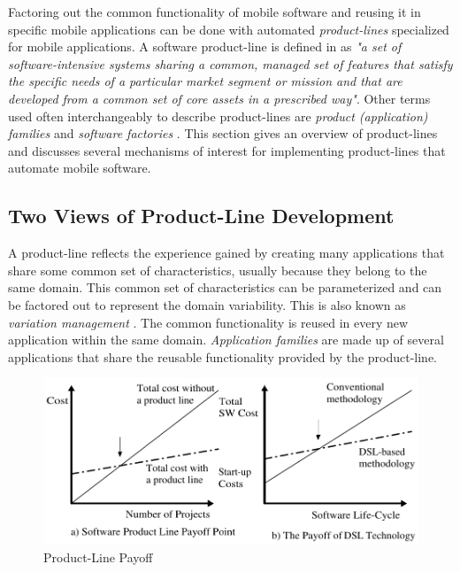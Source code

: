 Factoring out the common functionality of mobile software and reusing it in specific mo\-bi\-le appli\-ca\-tions can be done with automated \textit{product-lines} \cite{Parnas.pl.96} specialized for mobile applications.
%
A software product-line is defined in \cite{pl.02} as \textit{"a set of software-intensive systems sharing a common, managed set of features that satisfy the specific needs of a particular market segment or mission and that are developed from a common set of core assets in a prescribed way"}. Other terms used often interchangeably to describe product-lines are \textit{product (application) families} \cite{Parnas.pl.96,pf.00} and \textit{software factories} \cite{sf.04}. This section gives an overview of product-lines and discusses several mechanisms of interest for implementing product-lines that automate mobile software. %

\subsection{Two Views of Product-Line Development}
\label{sec.iterative.pl}

A product-line reflects the experience gained by creating many applications that share some common set of characteristics, usually because they belong to the same domain. This common set of characteristics can be parameterized and can be factored out to represent the domain variability. This is also known as \textit{variation management} \cite{harsu.2001}. The common functionality is reused \cite{pl.levels.00} in every new application within the same domain. \textit{Application families} \cite{pf.00,Parnas.pl.96} are made up of several applications that share the reusable functionality provided by the product-line. 

\begin{figure}[ht]
	\begin{center}
		\includegraphics[width=12cm,height=!]{ch02/pl-cost}
	\end{center}
	\caption{Product-Line Payoff}
	\label{fig:pl-cost}
\end{figure}

